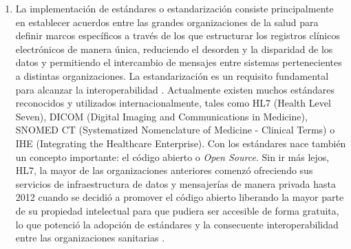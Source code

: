 \begin{enumerate}[label=\alph*.]

    \item La implementación de estándares o estandarización consiste principalmente en establecer acuerdos entre las grandes organizaciones de la salud para definir marcos específicos a través de los que estructurar los registros clínicos electrónicos de manera única, reduciendo el desorden y la disparidad de los datos y permitiendo el intercambio de mensajes entre sistemas pertenecientes a distintas organizaciones. La estandarización es un requisito fundamental para alcanzar la interoperabilidad \cite{katehakis2019framework}. Actualmente existen muchos estándares reconocidos y utilizados internacionalmente, tales como HL7 (Health Level Seven), DICOM (Digital Imaging and Communications in Medicine), SNOMED CT (Systematized Nomenclature of Medicine - Clinical Terms) o IHE (Integrating the Healthcare Enterprise). Con los estándares nace también un concepto importante: el código abierto o \textit{Open Source}. Sin ir más lejos, HL7, la mayor de las organizaciones anteriores comenzó ofreciendo sus servicios de infraestructura de datos y mensajerías de manera privada hasta 2012 cuando se decidió a promover el código abierto liberando la mayor parte de su propiedad intelectual para que pudiera ser accesible de forma gratuita, lo que potenció la adopción de estándares y la consecuente interoperabilidad entre las organizaciones sanitarias \cite{berryman2013data}.


\end{enumerate}
